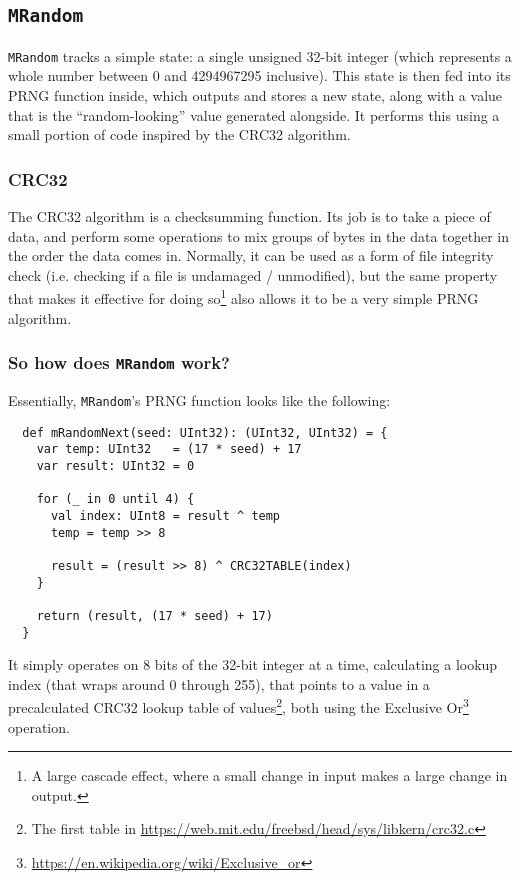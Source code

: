 \documentclass[14pt,a4paper,notitlepage]{extarticle}
\begin{document}
        \subsection*{\texttt{MRandom}}
            \texttt{MRandom} tracks a simple state: a single unsigned 32-bit integer (which
            represents a whole number between 0 and 4294967295 inclusive). This state is then
            fed into its PRNG function inside, which outputs and stores a new state, along
            with a value that is the ``random-looking'' value generated alongside. It performs
            this using a small portion of code inspired by the CRC32 algorithm.

            \subsubsection*{CRC32}
                The CRC32 algorithm is a checksumming function. Its job is to take a piece of
                data, and perform some operations to mix groups of bytes in the data together
                in the order the data comes in. Normally, it can be used as a form of file
                integrity check (i.e. checking if a file is undamaged / unmodified), but the
                same property that makes it effective for doing so\footnote{A large cascade
                effect, where a small change in input makes a large change in output.} also
                allows it to be a very simple PRNG algorithm.

            \subsubsection*{So how does \texttt{MRandom} work?}
                Essentially, \texttt{MRandom}'s PRNG function looks like the following:

                \begin{lstlisting}
  def mRandomNext(seed: UInt32): (UInt32, UInt32) = {
    var temp: UInt32   = (17 * seed) + 17
    var result: UInt32 = 0

    for (_ in 0 until 4) {
      val index: UInt8 = result ^ temp
      temp = temp >> 8

      result = (result >> 8) ^ CRC32TABLE(index)
    }

    return (result, (17 * seed) + 17)
  }
                \end{lstlisting}

                It simply operates on 8 bits of the 32-bit integer at a time, calculating a
                lookup index (that wraps around 0 through 255), that points to a value in
                a precalculated CRC32 lookup table of values\footnote{The first table in
                \url{https://web.mit.edu/freebsd/head/sys/libkern/crc32.c}}, both using the
                Exclusive Or\footnote{\url{https://en.wikipedia.org/wiki/Exclusive_or}}
                operation.
\end{document}
